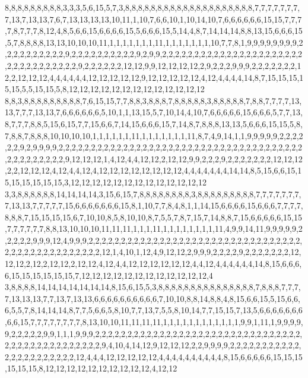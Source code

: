 8,8,8,8,8,8,8,8,8,3,3,3,5,6,15,5,7,3,8,8,8,8,8,8,8,8,8,8,8,8,8,8,8,8,8,8,8,8,7,7,7,7,7,7,7,7,13,7,13,13,7,6,7,13,13,13,13,10,11,1,10,7,6,6,10,1,10,14,10,7,6,6,6,6,6,6,15,15,7,7,7,7,8,7,7,7,8,12,4,8,5,6,6,15,6,6,6,6,15,5,6,6,6,15,5,14,4,8,7,14,14,14,8,8,13,15,6,6,6,15,5,7,8,8,8,8,13,13,10,10,10,11,1,1,1,1,1,1,1,11,1,1,1,1,1,1,1,10,7,7,8,1,9,9,9,9,9,9,9,9,2,2,2,2,2,2,2,2,2,2,9,2,2,2,2,2,2,2,2,2,2,9,2,9,9,2,2,2,2,2,2,2,2,2,2,2,2,2,2,2,2,2,2,2,2,2,2,2,2,2,2,2,2,2,2,2,2,2,9,2,2,2,2,2,2,12,12,9,9,12,12,12,12,2,9,2,2,2,9,9,9,2,2,2,2,2,2,2,12,2,12,12,12,4,4,4,4,4,4,12,12,12,12,12,9,12,12,12,12,12,4,12,4,4,4,4,14,8,7,15,15,15,15,15,5,5,15,15,5,8,12,12,12,12,12,12,12,12,12,12,12,12,12
8,8,3,8,8,8,8,8,8,8,8,8,7,6,15,15,7,7,8,8,3,8,8,8,7,8,8,8,8,8,3,8,8,8,8,8,7,8,8,7,7,7,7,13,13,7,7,7,13,13,7,6,6,6,6,6,6,5,10,1,1,13,15,5,7,10,14,4,10,7,6,6,6,6,6,15,6,6,6,5,7,7,13,8,7,7,7,8,8,5,15,6,15,7,7,15,6,6,7,14,15,6,6,6,15,7,14,8,7,8,8,8,13,13,5,6,6,6,15,15,5,8,7,8,8,7,8,8,8,10,10,10,10,1,1,1,1,1,1,11,1,1,1,1,1,1,1,11,8,7,4,9,14,1,1,9,9,9,9,9,2,2,2,2,2,2,9,2,9,9,9,9,2,2,2,2,2,2,2,2,2,2,2,2,2,2,2,2,2,2,2,2,2,2,2,2,2,2,2,2,2,2,2,2,2,2,2,2,2,2,2,2,2,2,2,2,2,2,2,9,12,12,12,1,4,12,4,4,12,12,2,12,12,9,9,2,2,2,9,2,2,2,2,2,2,2,12,12,12,2,2,12,12,12,4,12,4,4,12,4,12,12,12,12,12,12,12,12,4,4,4,4,4,4,4,14,14,8,5,15,6,6,15,15,15,15,15,15,15,3,12,12,12,12,12,12,12,12,12,12,12,12,12
3,3,8,8,8,8,8,8,14,14,14,14,3,15,6,15,7,8,8,8,8,8,8,8,8,3,8,8,8,8,8,8,8,8,8,7,7,7,7,7,7,7,7,13,13,7,7,7,7,7,15,6,6,6,6,6,6,6,15,8,1,10,7,7,8,4,8,1,1,14,15,6,6,6,6,15,6,6,6,7,7,7,7,8,8,8,7,15,15,15,15,6,7,10,10,8,5,8,10,10,8,7,5,5,7,8,7,15,7,14,8,8,7,15,6,6,6,6,6,15,15,7,7,7,7,7,7,8,8,13,10,10,10,11,11,11,1,1,1,11,1,1,1,1,1,1,1,1,11,4,9,9,14,11,9,9,9,9,9,2,2,2,2,2,9,9,9,12,4,9,9,9,2,2,2,2,2,2,2,2,2,2,2,2,2,2,2,2,2,2,2,2,2,2,2,2,2,2,2,2,2,2,2,2,2,2,2,2,2,2,2,2,2,2,2,2,2,2,2,2,12,1,4,10,1,12,4,9,12,12,2,9,9,9,2,2,2,2,9,2,2,2,2,2,2,2,12,12,12,2,12,2,12,12,2,12,12,4,12,4,4,12,12,12,12,12,12,4,4,12,4,4,4,4,4,4,14,8,15,6,6,6,6,15,15,15,15,15,15,7,12,12,12,12,12,12,12,12,12,12,12,12,4
3,8,8,8,8,14,14,14,14,14,14,14,8,15,6,15,5,3,8,8,8,8,8,8,8,8,8,8,8,8,8,8,8,7,8,8,8,7,7,7,7,13,13,13,7,7,13,7,13,13,6,6,6,6,6,6,6,6,6,6,7,10,10,8,8,14,8,8,4,8,15,6,6,15,5,15,6,6,6,5,5,7,8,14,14,14,8,7,7,5,6,6,5,8,10,7,7,13,7,5,5,8,10,14,7,7,15,15,7,13,5,6,6,6,6,6,6,6,6,6,15,7,7,7,7,7,7,7,7,8,13,10,10,11,11,11,11,1,1,1,1,1,1,1,1,1,1,1,1,9,9,1,11,1,9,9,9,9,9,2,2,2,2,2,9,9,1,1,1,9,9,9,2,2,2,2,2,2,2,2,2,2,2,2,2,2,2,2,2,2,2,2,2,2,2,2,2,2,2,2,2,2,2,2,2,2,2,2,2,2,2,2,2,2,2,2,2,2,2,9,4,10,4,14,12,9,12,12,12,2,2,9,9,9,9,2,2,2,2,2,2,2,2,2,2,2,2,2,2,2,2,2,2,2,2,2,2,12,4,4,4,12,12,12,12,12,4,4,4,4,4,4,4,4,4,4,8,15,6,6,6,6,6,15,15,15,15,15,15,8,12,12,12,12,12,12,12,12,12,12,4,12,12
